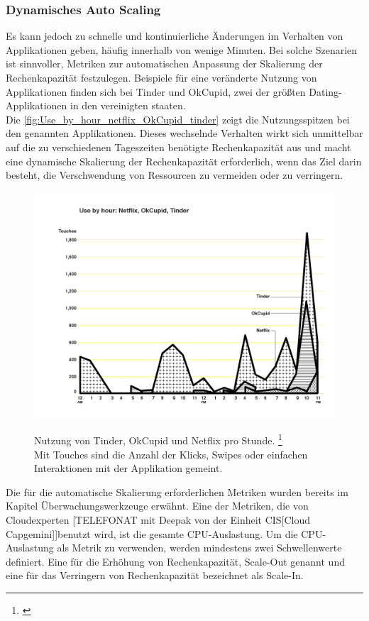\subsubsection{Dynamisches Auto Scaling}
Es kann jedoch zu schnelle und kontinuierliche Änderungen im Verhalten von Applikationen geben, häufig innerhalb von wenige Minuten. Bei solche Szenarien ist sinnvoller, Metriken zur automatischen Anpassung der Skalierung der Rechenkapazität festzulegen. Beispiele für eine veränderte Nutzung von Applikationen finden sich bei Tinder und OkCupid, zwei der größten Dating-Applikationen in den vereinigten staaten. \\
Die \autoref{fig:Use_by_hour_netflix_OkCupid_tinder} zeigt die Nutzungsspitzen bei den genannten Applikationen. Dieses wechselnde Verhalten wirkt sich unmittelbar auf die zu verschiedenen Tageszeiten benötigte Rechenkapazität aus und macht eine dynamische Skalierung der Rechenkapazität erforderlich, wenn das Ziel darin besteht, die Verschwendung von Ressourcen zu vermeiden oder zu verringern. 
\begin{figure}[h!]
  \centering
  \includegraphics[scale=0.4]{sources/Use_by_hour_netflix_OkCupid_tinder}
  \caption[Nutzung von Tinder, OkCupid und Netflix pro Stunde]{}\label{fig:Use_by_hour_netflix_OkCupid_tinder} Nutzung von Tinder, OkCupid und Netflix pro Stunde.  
  \footnote{\cite{SCOUT1}}
  \\Mit Touches sind die Anzahl der Klicks, Swipes oder einfachen Interaktionen mit der Applikation gemeint.
\end{figure}
Die für die automatische Skalierung erforderlichen Metriken wurden bereits im Kapitel Überwachungswerkzeuge erwähnt. Eine der Metriken, die von Cloudexperten [TELEFONAT mit Deepak von der Einheit CIS[Cloud Capgemini]]benutzt wird, ist die gesamte CPU-Auslastung. 
Um die CPU-Auslastung als Metrik zu verwenden, werden mindestens zwei Schwellenwerte definiert. Eine für die Erhöhung von Rechenkapazität, Scale-Out genannt und eine für das Verringern von Rechenkapazität bezeichnet als Scale-In.

